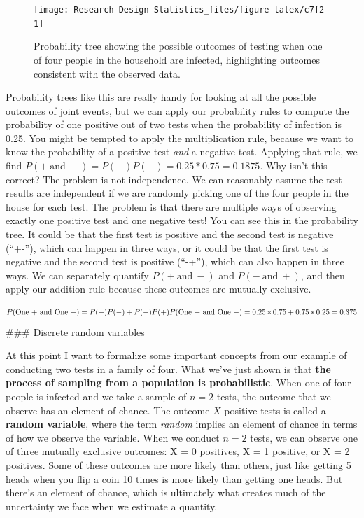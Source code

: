 \documentclass[
]{book}
\begin{document}
\begin{figure}

{\centering \texttt{[image: Research-Design---Statistics\_files/figure-latex/c7f2-1]} 

}

\caption{Probability tree showing the possible outcomes of testing when one of four people in the household are infected, highlighting outcomes consistent with the observed data.}\label{fig:c7f2}
\end{figure}

Probability trees like this are really handy for looking at all the possible outcomes of joint events, but we can apply our probability rules to compute the probability of one positive out of two tests when the probability of infection is 0.25. You might be tempted to apply the multiplication rule, because we want to know the probability of a positive test \emph{and} a negative test. Applying that rule, we find \(P(+\ \text{and}\ -) = P(+)P(-) = 0.25*0.75=0.1875\). Why isn't this correct? The problem is not independence. We can reasonably assume the test results are independent if we are randomly picking one of the four people in the house for each test. The problem is that there are multiple ways of observing exactly one positive test and one negative test! You can see this in the probability tree. It could be that the first test is positive and the second test is negative (``+-''), which can happen in three ways, or it could be that the first test is negative and the second test is positive (``-+''), which can also happen in three ways. We can separately quantify \(P(+\ \text{and}\ -)\) and \(P(-\ \text{and}\ +)\), and then apply our addition rule because these outcomes are mutually exclusive.

\[
P(\text{One +}\ \text{and}\ \text{One}\ - ) = P(+)P(-) + P(-)P(+)\\
P(\text{One +}\ \text{and}\ \text{One}\ - ) = 0.25*0.75 + 0.75*0.25=0.375
\]
\#\#\# Discrete random variables

At this point I want to formalize some important concepts from our example of conducting two tests in a family of four. What we've just shown is that \textbf{the process of sampling from a population is probabilistic}. When one of four people is infected and we take a sample of \(n = 2\) tests, the outcome that we observe has an element of chance. The outcome \(X\) positive tests is called a \textbf{random variable}, where the term \emph{random} implies an element of chance in terms of how we observe the variable. When we conduct \(n=2\) tests, we can observe one of three mutually exclusive outcomes: X = 0 positives, X = 1 positive, or X = 2 positives. Some of these outcomes are more likely than others, just like getting 5 heads when you flip a coin 10 times is more likely than getting one heads. But there's an element of chance, which is ultimately what creates much of the uncertainty we face when we estimate a quantity.
\end{document}
